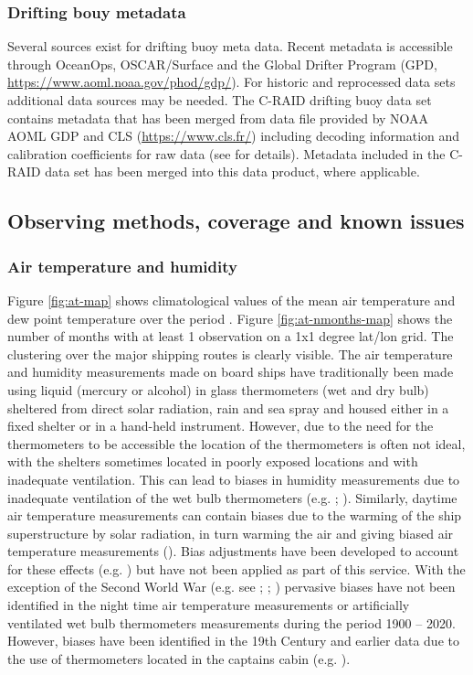\subsubsection{Drifting bouy metadata}
Several sources exist for drifting buoy meta data. Recent metadata is accessible through OceanOps, OSCAR/Surface and the Global Drifter Program (GPD, \url{https://www.aoml.noaa.gov/phod/gdp/}).
For historic and reprocessed data sets additional data sources may be needed.
The C-RAID drifting buoy data set contains metadata that has been merged from data file provided by NOAA AOML GDP and CLS (\url{https://www.cls.fr/}) including decoding information and calibration coefficients for raw data (see \cite{craid202404activity} for details).
Metadata included in the C-RAID data set has been merged into this data product, where applicable.

\FloatBarrier
\subsection{Observing methods, coverage and known issues}
\subsubsection{Air temperature and humidity}
Figure \ref{fig:at-map} shows climatological values of the mean air temperature and dew point temperature over the period \datatimerange{}. 
Figure \ref{fig:at-nmonths-map} shows the number of months with at least 1 observation on a 1x1 degree lat/lon grid. 
The clustering over the major shipping routes is clearly visible.
The air temperature and humidity measurements made on board ships have traditionally been made using liquid (mercury or alcohol) in glass thermometers (wet and dry bulb) sheltered from direct solar radiation, rain and sea spray and housed either in a fixed shelter or in a hand-held instrument. 
However, due to the need for the thermometers to be accessible the location of the thermometers is often not ideal, with the shelters sometimes located in poorly exposed locations and with inadequate ventilation.
This can lead to biases in humidity measurements due to inadequate ventilation of the wet bulb thermometers (e.g. \cite{Berry2011}; \cite{Willett2008}). 
Similarly, daytime air temperature measurements can contain biases due to the warming of the ship superstructure by solar radiation, in turn warming the air and giving biased air temperature measurements (\cite{Rayner2003}). 
Bias adjustments have been developed to account for these effects (e.g. \cite{Berry2004}) but have not been applied as part of this service. 
With the exception of the Second World War (e.g. see \cite{Cornes2020}; \cite{Kent2013NMAT}; \cite{Rayner2003}) pervasive biases have not been identified in the night time air temperature measurements or artificially ventilated wet bulb thermometers measurements during the period 1900 – 2020.
However, biases have been identified in the 19th Century and earlier data due to the use of thermometers located in the captains cabin (e.g. \cite{Chenoweth2000}).


